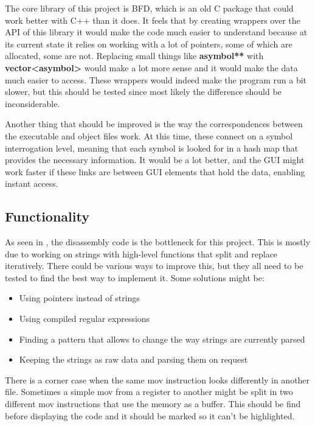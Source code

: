 \fwpara The core library of this project is BFD, which is an old C package that could work better with C++ than it does. It feels that by creating wrappers over the API of this library it would make the code much easier to understand because at its current state it relies on working with a lot of pointers, some of which are allocated, some are not. Replacing small things like \textbf{asymbol**} with \textbf{vector<asymbol>} would make a lot more sense and it would make the data much easier to access. These wrappers would indeed make the program run a bit slower, but this should be tested since most likely the difference should be inconsiderable.

\fwpara Another thing that should be improved is the way the correspondences between the executable and object files work. At this time, these connect on a symbol interrogation level, meaning that each symbol is looked for in a hash map that provides the necessary information. It would be a lot better, and the GUI might work faster if these links are between GUI elements that hold the data, enabling instant access.

\subsection{Functionality}
\label{sub-sec:func}

\fwpara As seen in , the disassembly code is the bottleneck for this project. This is mostly due to working on strings with high-{}level functions that split and replace iteratively. There could be various ways to improve this, but they all need to be tested to find the best way to implement it. Some solutions might be:

\begin{itemize}  
	\item Using pointers instead of strings 
	\item Using compiled regular expressions 
	\item Finding a pattern that allows to change the way strings are currently parsed 
	\item Keeping the strings as raw data and parsing them on request
\end{itemize}

\fwpara There is a corner case when the same mov instruction looks differently in another file. Sometimes a simple mov from a register to another might be split in two different mov instructions that use the memory as a buffer. This should be find before displaying the code and it should be marked so it can't be highlighted.

